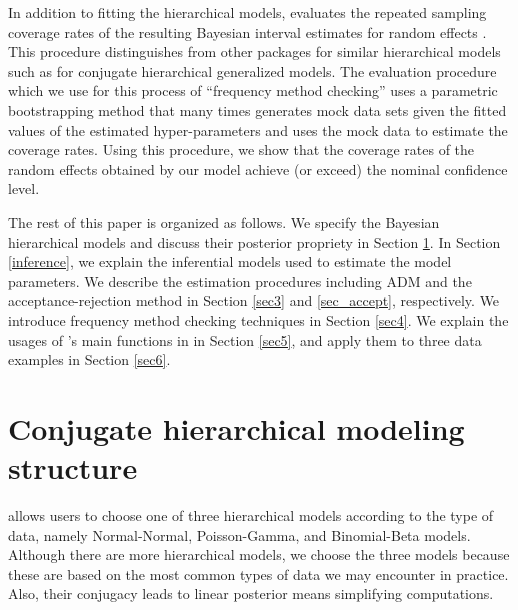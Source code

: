 \documentclass[article]{jss}
\begin{document}
In addition to fitting the hierarchical models,  evaluates the repeated sampling coverage rates of the resulting Bayesian interval estimates for random effects \citep{morris1997, daniels1999prior, tang2002fitting, tang2011, morris2012}. This procedure distinguishes   from  other  packages for similar hierarchical models such as  \citep{hglm2010, ronnegaard2011hglm} for conjugate hierarchical generalized models. The evaluation procedure which we use for this process of ``frequency method checking'' uses a parametric bootstrapping  method that many times generates mock data sets given the fitted values of the estimated hyper-parameters and uses the mock data to estimate the coverage rates.  Using this procedure, we show that the coverage rates of the random effects obtained by our model achieve (or exceed) the nominal confidence level.

The rest of this paper is organized as follows. We specify the Bayesian hierarchical models and discuss their posterior propriety in Section \ref{sec2}. In Section \ref{inference}, we explain the inferential models used to estimate the model parameters. We describe the estimation procedures including  ADM and the acceptance-rejection method in Section  \ref{sec3} and \ref{sec_accept}, respectively. We introduce  frequency method checking techniques in Section \ref{sec4}.  We explain the usages of 's main functions in  in Section \ref{sec5}, and apply them to three data examples in Section \ref{sec6}.

\section[Hierarchical Structure]{Conjugate hierarchical modeling structure} \label{sec2}


 allows users to choose one of three hierarchical models according to the type of data, namely Normal-Normal, Poisson-Gamma, and Binomial-Beta models. Although there are more hierarchical models, we choose the three models because these are based on the most common types of  data we may encounter in practice. Also, their conjugacy leads to linear posterior means simplifying computations.
\end{document}
